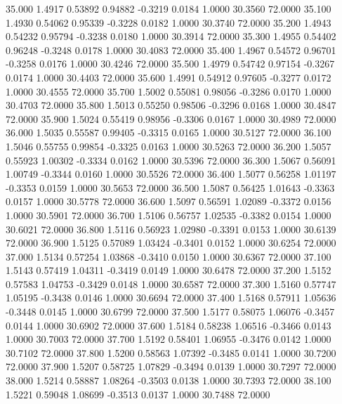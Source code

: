  35.000   1.4917   0.53892   0.94882  -0.3219   0.0184   1.0000  30.3560  72.0000
  35.100   1.4930   0.54062   0.95339  -0.3228   0.0182   1.0000  30.3740  72.0000
  35.200   1.4943   0.54232   0.95794  -0.3238   0.0180   1.0000  30.3914  72.0000
  35.300   1.4955   0.54402   0.96248  -0.3248   0.0178   1.0000  30.4083  72.0000
  35.400   1.4967   0.54572   0.96701  -0.3258   0.0176   1.0000  30.4246  72.0000
  35.500   1.4979   0.54742   0.97154  -0.3267   0.0174   1.0000  30.4403  72.0000
  35.600   1.4991   0.54912   0.97605  -0.3277   0.0172   1.0000  30.4555  72.0000
  35.700   1.5002   0.55081   0.98056  -0.3286   0.0170   1.0000  30.4703  72.0000
  35.800   1.5013   0.55250   0.98506  -0.3296   0.0168   1.0000  30.4847  72.0000
  35.900   1.5024   0.55419   0.98956  -0.3306   0.0167   1.0000  30.4989  72.0000
  36.000   1.5035   0.55587   0.99405  -0.3315   0.0165   1.0000  30.5127  72.0000
  36.100   1.5046   0.55755   0.99854  -0.3325   0.0163   1.0000  30.5263  72.0000
  36.200   1.5057   0.55923   1.00302  -0.3334   0.0162   1.0000  30.5396  72.0000
  36.300   1.5067   0.56091   1.00749  -0.3344   0.0160   1.0000  30.5526  72.0000
  36.400   1.5077   0.56258   1.01197  -0.3353   0.0159   1.0000  30.5653  72.0000
  36.500   1.5087   0.56425   1.01643  -0.3363   0.0157   1.0000  30.5778  72.0000
  36.600   1.5097   0.56591   1.02089  -0.3372   0.0156   1.0000  30.5901  72.0000
  36.700   1.5106   0.56757   1.02535  -0.3382   0.0154   1.0000  30.6021  72.0000
  36.800   1.5116   0.56923   1.02980  -0.3391   0.0153   1.0000  30.6139  72.0000
  36.900   1.5125   0.57089   1.03424  -0.3401   0.0152   1.0000  30.6254  72.0000
  37.000   1.5134   0.57254   1.03868  -0.3410   0.0150   1.0000  30.6367  72.0000
  37.100   1.5143   0.57419   1.04311  -0.3419   0.0149   1.0000  30.6478  72.0000
  37.200   1.5152   0.57583   1.04753  -0.3429   0.0148   1.0000  30.6587  72.0000
  37.300   1.5160   0.57747   1.05195  -0.3438   0.0146   1.0000  30.6694  72.0000
  37.400   1.5168   0.57911   1.05636  -0.3448   0.0145   1.0000  30.6799  72.0000
  37.500   1.5177   0.58075   1.06076  -0.3457   0.0144   1.0000  30.6902  72.0000
  37.600   1.5184   0.58238   1.06516  -0.3466   0.0143   1.0000  30.7003  72.0000
  37.700   1.5192   0.58401   1.06955  -0.3476   0.0142   1.0000  30.7102  72.0000
  37.800   1.5200   0.58563   1.07392  -0.3485   0.0141   1.0000  30.7200  72.0000
  37.900   1.5207   0.58725   1.07829  -0.3494   0.0139   1.0000  30.7297  72.0000
  38.000   1.5214   0.58887   1.08264  -0.3503   0.0138   1.0000  30.7393  72.0000
  38.100   1.5221   0.59048   1.08699  -0.3513   0.0137   1.0000  30.7488  72.0000
